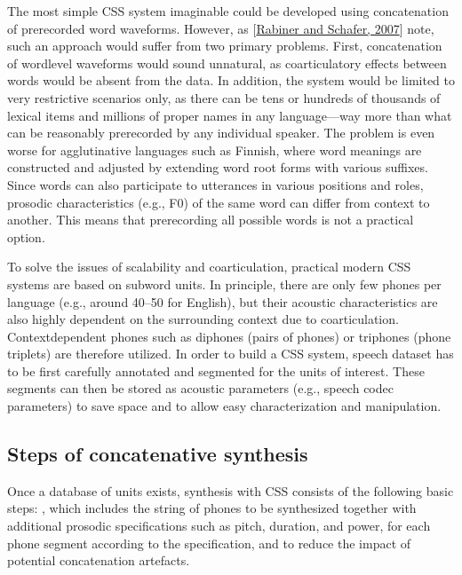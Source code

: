 \documentclass[letterpaper,10pt,english]{jupyterBook}
\begin{document}
\sphinxAtStartPar
The most simple CSS system imaginable could be developed using
concatenation of pre\sphinxhyphen{}recorded word waveforms. However, as {[}\hyperlink{cite.Synthesis/Concatenative_speech_synthesis:id55}{Rabiner and Schafer, 2007}{]} note, such an approach would suffer from two primary
problems. First, concatenation of word\sphinxhyphen{}level waveforms would sound
unnatural, as coarticulatory effects between words would be absent from
the data. In addition, the system would be limited to very restrictive
scenarios only, as there can be tens or hundreds of thousands of lexical
items and millions of proper names in any language—way more than what
can be reasonably pre\sphinxhyphen{}recorded by any individual speaker. The problem is
even worse for agglutinative languages such as Finnish, where word
meanings are constructed and adjusted by extending word root forms with
various suffixes. Since words can also participate to utterances in
various positions and roles, prosodic characteristics (e.g., F0) of the
same word can differ from context to another. This means that
pre\sphinxhyphen{}recording all possible words is not a practical option.

\sphinxAtStartPar
To solve the issues of scalability and coarticulation, practical modern
CSS systems are based on sub\sphinxhyphen{}word units. In principle, there are only
few phones per language (e.g., around 40–50 for English), but their
acoustic characteristics are also highly dependent on the surrounding
context due to coarticulation. Context\sphinxhyphen{}dependent phones such as diphones
(pairs of phones) or triphones (phone triplets) are therefore utilized.
In order to build a CSS system, speech dataset has to be first carefully
annotated and segmented for the units of interest. These segments can
then be stored as acoustic parameters (e.g., speech codec parameters) to
save space and to allow easy characterization and manipulation.


\subsection{Steps of concatenative synthesis}
\label{\detokenize{Synthesis/Concatenative_speech_synthesis:steps-of-concatenative-synthesis}}
\sphinxAtStartPar
Once a database of units exists, synthesis with CSS consists of the
following basic steps:  , which includes the string of phones to be synthesized
together with additional prosodic specifications such as pitch,
duration, and power,   for each phone segment
according to the specification, and   to reduce
the impact of potential concatenation artefacts.
\end{document}
